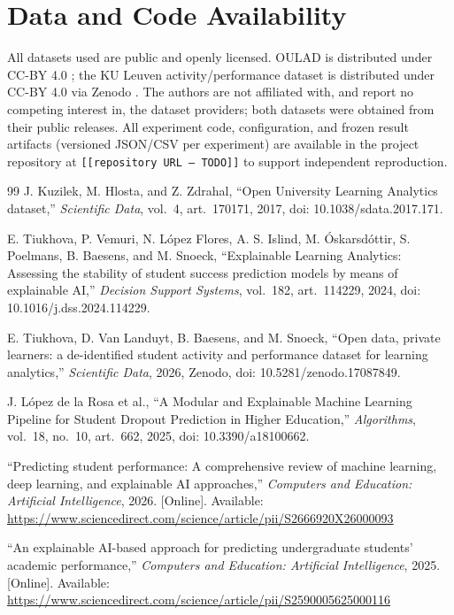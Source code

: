 \documentclass[conference]{IEEEtran}
\begin{document}
\section*{Data and Code Availability}
All datasets used are public and openly licensed. OULAD is distributed under
CC-BY 4.0 \cite{kuzilek2017}; the KU Leuven activity/performance dataset is
distributed under CC-BY 4.0 via Zenodo \cite{tiukhova2026}. The authors are not
affiliated with, and report no competing interest in, the dataset providers; both
datasets were obtained from their public releases. All experiment code,
configuration, and frozen result artifacts (versioned JSON/CSV per experiment)
are available in the project repository at \texttt{[[repository URL --- TODO]]}
to support independent reproduction.

\begin{thebibliography}{99}
 J. Kuzilek, M. Hlosta, and Z. Zdrahal, ``Open University
Learning Analytics dataset,'' \emph{Scientific Data}, vol.~4, art.~170171, 2017,
doi: 10.1038/sdata.2017.171.

 E. Tiukhova, P. Vemuri, N. L\'opez Flores, A. S. Islind,
M. \'Oskarsd\'ottir, S. Poelmans, B. Baesens, and M. Snoeck, ``Explainable
Learning Analytics: Assessing the stability of student success prediction models
by means of explainable AI,'' \emph{Decision Support Systems}, vol.~182,
art.~114229, 2024, doi: 10.1016/j.dss.2024.114229.

 E. Tiukhova, D. Van Landuyt, B. Baesens, and M. Snoeck,
``Open data, private learners: a de-identified student activity and performance
dataset for learning analytics,'' \emph{Scientific Data}, 2026, Zenodo,
doi: 10.5281/zenodo.17087849.

 J. L\'opez de la Rosa et al., ``A Modular and Explainable
Machine Learning Pipeline for Student Dropout Prediction in Higher Education,''
\emph{Algorithms}, vol.~18, no.~10, art.~662, 2025, doi: 10.3390/a18100662.

 ``Predicting student performance: A comprehensive review of
machine learning, deep learning, and explainable AI approaches,'' \emph{Computers
and Education: Artificial Intelligence}, 2026. [Online]. Available:
\url{https://www.sciencedirect.com/science/article/pii/S2666920X26000093}

 ``An explainable AI-based approach for predicting undergraduate
students' academic performance,'' \emph{Computers and Education: Artificial
Intelligence}, 2025. [Online]. Available:
\url{https://www.sciencedirect.com/science/article/pii/S2590005625000116}


\end{thebibliography}
\end{document}
